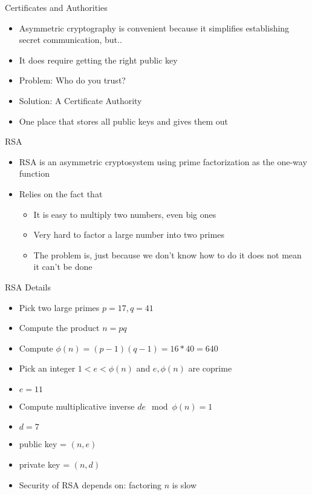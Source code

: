 \begin{withoutheadline}
\begin{frame}{Certificates and Authorities}
    \begin{itemize}
        \item Asymmetric cryptography is convenient because it simplifies establishing secret communication, but..
        \item It does require getting the right public key
        \item Problem: Who do you trust?
        \item Solution: A Certificate Authority
        \item One place that stores all public keys and gives them out
    \end{itemize}
\end{frame}


\begin{frame}{RSA}
    \begin{itemize}
        \item RSA is an asymmetric cryptosystem using prime factorization as the one-way function
        \item Relies on the fact that
        \begin{itemize}
            \item It is easy to multiply two numbers, even big ones
            \item Very hard to factor a large number into two primes
            \item The problem is, just because we don't know how to do it does not mean it can't be done
        \end{itemize}
    \end{itemize}
\end{frame}

\begin{frame}{RSA Details}
    \begin{itemize}
        \item Pick two large primes $p=17, q=41$
        \item Compute the product $n = p q$
        \item Compute $ \phi(n) = ( p-1 )( q-1 ) = 16*40 = 640$
        \item Pick an integer $1 < e < \phi(n)$ and $e, \phi(n)$ are coprime
        \item $e = 11$
        \item Compute multiplicative inverse $d e \mod \phi(n) = 1$
        \item $d = 7$
        \item public key = $( n, e )$
        \item private key = $( n, d )$
        \item Security of RSA depends on: factoring $n$ is slow
    \end{itemize}
\end{frame}


\end{withoutheadline}
